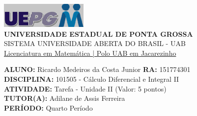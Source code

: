 \documentclass[a4paper, 12pt]{article}
\begin{document}
\begin{flushleft}\includegraphics{logo}\\
\textbf{UNIVERSIDADE ESTADUAL DE PONTA GROSSA} \\
SISTEMA UNIVERSIDADE ABERTA DO BRASIL - UAB \\
\underline{Licenciatura em Matemática | Polo UAB em Jacarezinho}\end{flushleft} 
\textbf{ALUNO:} Ricardo Medeiros da Costa Junior   \textbf{RA:} 151774301 \\
\textbf{DISCIPLINA:} 101505 - Cálculo Diferencial e Integral II \\
\textbf{ATIVIDADE:} Tarefa - Unidade II (Valor: 5 pontos) \\
\textbf{TUTOR(A):} Adilane de Assis Ferreira \\
\textbf{PERÍODO:} Quarto Período \\
\end{document}
